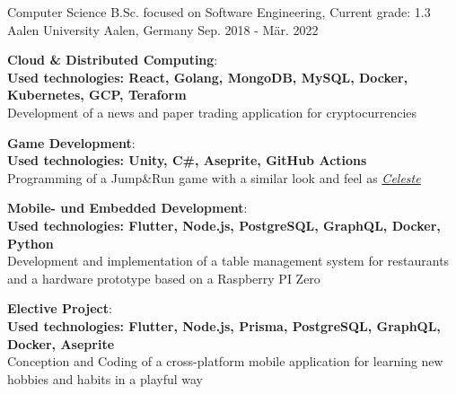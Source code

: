

\begin{cventries}

  \cventry
    {Computer Science B.Sc. focused on Software Engineering, Current grade: 1.3} %
    {Aalen University} %
    {Aalen, Germany} %
    {Sep. 2018 - Mär. 2022} %
    {
      \begin{cvitems} %
        \item {\textbf{\faCloud{} Cloud \& Distributed Computing}: \\ 
         {\scriptsize\textbf{Used technologies: React, Golang, MongoDB, MySQL, Docker, Kubernetes, GCP, Teraform}} \\
         Development of a news and paper trading application for cryptocurrencies}
        \item {\textbf{\faGamepad{} Game Development}: \\ 
         {\scriptsize\textbf{Used technologies: Unity, C\#, Aseprite, GitHub Actions}} \\
         Programming of a Jump\&Run game with a similar look and feel as \href{https://store.steampowered.com/app/504230/Celeste/}{\textit{Celeste}}}
        \item {\textbf{\faMobile{} Mobile- und Embedded Development}: \\
        {\scriptsize\textbf{Used technologies: Flutter, Node.js, PostgreSQL, GraphQL, Docker, Python}} \\
        Development and implementation of a table management system for restaurants and a hardware prototype based on a Raspberry PI Zero}
        \item {\faHandSpockO{} \textbf{Elective Project}: \\
        {\scriptsize\textbf{Used technologies: Flutter, Node.js, Prisma, PostgreSQL, GraphQL, Docker, Aseprite}} \\
        Conception and Coding of a cross-platform mobile application for learning new hobbies and habits in a playful way}
      \end{cvitems}
    }

\end{cventries}
